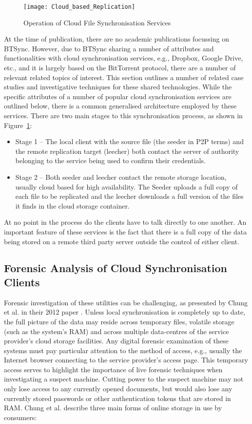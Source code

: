 \documentclass[final,5p,times,twocolumn]{elsarticle}
\begin{document}
\begin{figure}
\centering
\texttt{[image: Cloud\_based\_Replication]}
\caption{Operation of Cloud File Synchronisation Services}
\label{figcloud}
\end{figure}

At the time of publication, there are no academic publications focussing on BTSync. However, due to BTSync sharing a number of attributes and functionalities with cloud synchronisation services, e.g., Dropbox, Google Drive, etc., and it is largely based on the BitTorrent protocol, there are a number of relevant related topics of interest. This section outlines a number of related case studies and investigative techniques for these shared technologies. While the specific attributes of a number of popular cloud synchronisation services are outlined below, there is a common generalised architecture employed by these services. There are two main stages to this synchronisation process, as shown in Figure~\ref{figcloud}: 

\begin{itemize}
\item Stage 1 -- The local client with the source file (the seeder in P2P terms) and the remote replication target (leecher) both contact the server of authority belonging to the service being used to confirm their credentials.
\item Stage 2 -- Both seeder and leecher contact the remote storage location, usually cloud based for high availability. The Seeder uploads a full copy of each file to be replicated and the leecher downloads a full version of the files it finds in the cloud storage container.
\end{itemize}
At no point in the process do the clients have to talk directly to one another. An important feature of these services is the fact that there is a full copy of the data being stored on a remote third party server outside the control of either client. 


\subsection{Forensic Analysis of Cloud Synchronisation Clients}
\label{clientside}

Forensic investigation of these utilities can be challenging, as presented by Chung et al. in their 2012 paper \cite{Chung201281}. Unless local synchronisation is completely up to date, the full picture of the data may reside across temporary files, volatile storage (such as the system's RAM) and across multiple data-centres of the service provider's cloud storage facilities. Any digital forensic examination of these systems must pay particular attention to the method of access, e.g., usually the Internet browser connecting to the service provider's access page. This temporary access serves to highlight the importance of live forensic techniques when investigating a suspect machine. Cutting power to the suspect machine may not only lose access to any currently opened documents, but would also lose any currently stored passwords or other authentication tokens that are stored in RAM. Chung et al. describe three main forms of online storage in use by consumers:
\end{document}
